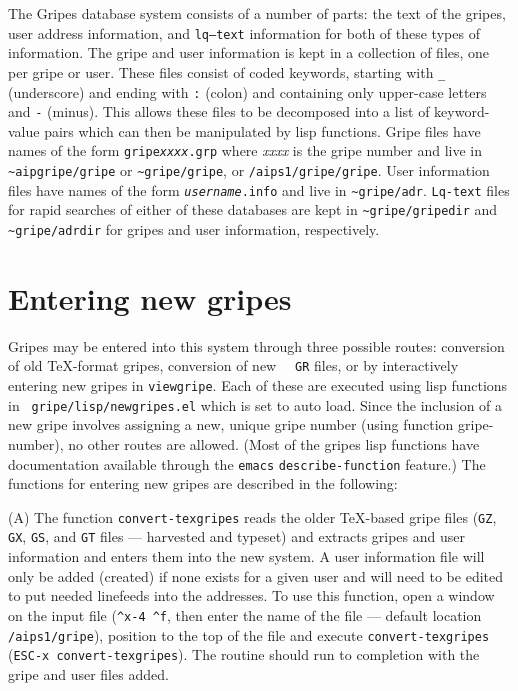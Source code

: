    The Gripes database system consists of a number of parts: the text
of the gripes, user address information, and {\tt lq--text}
information for both of these types of information.  The gripe and
user information is kept in a collection of files, one per gripe or
user.  These files consist of coded keywords, starting with {\tt \_}
(underscore) and ending with {\tt :} (colon) and
containing only upper-case letters and {\tt -} (minus).  This allows
these files to be decomposed into a list of keyword-value pairs which
can then be manipulated by lisp functions.  Gripe files have names of
the form {\tt gripe{\it xxxx}.grp} where {\it xxxx} is the gripe
number and live in {\tt \~{ }aipgripe/gripe} or {\tt \~{ }gripe/gripe},
or {\tt /aips1/gripe/gripe}.  User information files have names of the
form {\tt {\it username}.info} and live in {\tt \~{ }gripe/adr}.
{\tt Lq-text} files for rapid searches of either of these databases
are kept in {\tt \~{ }gripe/gripedir} and {\tt \~{ }gripe/adrdir} for
gripes and user information, respectively.

\section{Entering new gripes}

Gripes may be entered into this system through three possible routes:
conversion of old \TeX-format gripes, conversion of new \AIPS\ {\tt
GR} files, or by interactively entering new gripes in {\tt viewgripe}.
Each of these are executed using lisp functions in {\tt \~{
}gripe/lisp/newgripes.el} which is set to auto load.  Since the
inclusion of a new gripe involves assigning a new, unique gripe number
(using function gripe-number), no other routes are allowed.  (Most of
the gripes lisp functions have documentation available through the
{\tt emacs} {\tt describe-function} feature.)  The functions for
entering new gripes are described in the following:

(A) The function {\tt convert-texgripes} reads the older \TeX-based
gripe files ({\tt GZ}, {\tt GX}, {\tt GS}, and {\tt GT} files ---
harvested and typeset) and extracts gripes and user information and
enters them into the new system.  A user information file will only be
added (created) if none exists for a given user and will need to be
edited to put needed linefeeds into the addresses.  To use this
function, open a window on the input file ({\tt \^{ }x-4 \^{ }f}, then
enter the name of the file --- default location {\tt /aips1/gripe}),
position to the top of the file and execute {\tt convert-texgripes}
({\tt ESC-x convert-texgripes}). The routine should run to completion
with the gripe and user files added.

